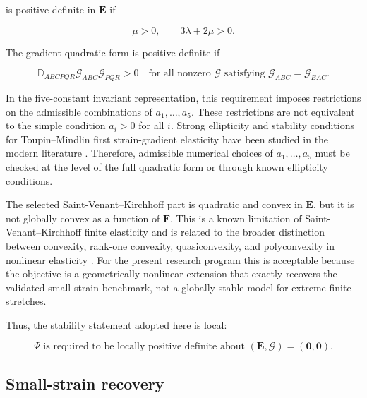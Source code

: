 \documentclass[11pt]{article}
\begin{document}
is positive definite in $\mathbf{E}$ if

\begin{equation}
\mu>0,
\qquad
3\lambda+2\mu>0.
\label{eq:sec2_lame_positive_conditions}
\end{equation}

The gradient quadratic form is positive definite if

\begin{equation}
\mathbb{D}_{ABCPQR}\mathcal{G}_{ABC}\mathcal{G}_{PQR}>0
\quad
\text{for all nonzero }
\bm{\mathcal{G}}
\text{ satisfying }
\mathcal{G}_{ABC}=\mathcal{G}_{BAC}.
\label{eq:sec2_D_positive_definite}
\end{equation}

In the five-constant invariant representation, this requirement imposes restrictions on the admissible combinations of $a_1,\ldots,a_5$. These restrictions are not equivalent to the simple condition $a_i>0$ for all $i$. Strong ellipticity and stability conditions for Toupin--Mindlin first strain-gradient elasticity have been studied in the modern literature \cite{EremeyevLazar2022}. Therefore, admissible numerical choices of $a_1,\ldots,a_5$ must be checked at the level of the full quadratic form or through known ellipticity conditions.

The selected Saint-Venant--Kirchhoff part is quadratic and convex in $\mathbf{E}$, but it is not globally convex as a function of $\mathbf{F}$. This is a known limitation of Saint-Venant--Kirchhoff finite elasticity and is related to the broader distinction between convexity, rank-one convexity, quasiconvexity, and polyconvexity in nonlinear elasticity \cite{Ball1976}. For the present research program this is acceptable because the objective is a geometrically nonlinear extension that exactly recovers the validated small-strain benchmark, not a globally stable model for extreme finite stretches.

Thus, the stability statement adopted here is local:

\begin{equation}
\Psi
\text{ is required to be locally positive definite about }
(\mathbf{E},\bm{\mathcal{G}})=(\mathbf{0},\mathbf{0}).
\label{eq:sec2_local_stability_statement}
\end{equation}

\subsection{Small-strain recovery}
\end{document}

